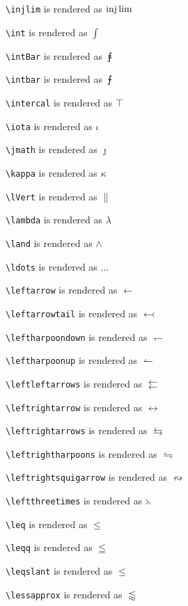 \texttt{\textbackslash injlim} is rendered as $\injlim$

\texttt{\textbackslash int} is rendered as $\int$

\texttt{\textbackslash intBar} is rendered as $\intBar$

\texttt{\textbackslash intbar} is rendered as $\intbar$

\texttt{\textbackslash intercal} is rendered as $\intercal$

\texttt{\textbackslash iota} is rendered as $\iota$

\texttt{\textbackslash jmath} is rendered as $\jmath$

\texttt{\textbackslash kappa} is rendered as $\kappa$

\texttt{\textbackslash lVert} is rendered as $\lVert$

\texttt{\textbackslash lambda} is rendered as $\lambda$

\texttt{\textbackslash land} is rendered as $\land$

\texttt{\textbackslash ldots} is rendered as $\ldots$

\texttt{\textbackslash leftarrow} is rendered as $\leftarrow$

\texttt{\textbackslash leftarrowtail} is rendered as $\leftarrowtail$

\texttt{\textbackslash leftharpoondown} is rendered as $\leftharpoondown$

\texttt{\textbackslash leftharpoonup} is rendered as $\leftharpoonup$

\texttt{\textbackslash leftleftarrows} is rendered as $\leftleftarrows$

\texttt{\textbackslash leftrightarrow} is rendered as $\leftrightarrow$

\texttt{\textbackslash leftrightarrows} is rendered as $\leftrightarrows$

\texttt{\textbackslash leftrightharpoons} is rendered as $\leftrightharpoons$

\texttt{\textbackslash leftrightsquigarrow} is rendered as $\leftrightsquigarrow$

\texttt{\textbackslash leftthreetimes} is rendered as $\leftthreetimes$

\texttt{\textbackslash leq} is rendered as $\leq$

\texttt{\textbackslash leqq} is rendered as $\leqq$

\texttt{\textbackslash leqslant} is rendered as $\leqslant$

\texttt{\textbackslash lessapprox} is rendered as $\lessapprox$

